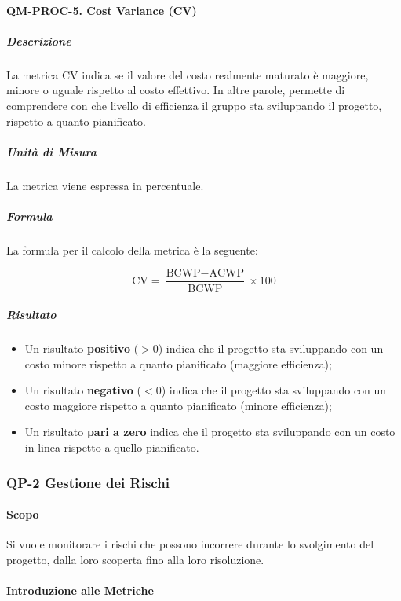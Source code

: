		\paragraph{QM-PROC-5. Cost Variance (CV)}

			\subparagraph{Descrizione}
			La metrica CV indica se il valore del costo realmente maturato è maggiore, minore o uguale rispetto al costo effettivo. In altre parole, permette di comprendere con che livello di efficienza il gruppo sta sviluppando il progetto, rispetto a quanto pianificato.

			\subparagraph{Unità di Misura}
			La metrica viene espressa in percentuale.

			\subparagraph{Formula}
			La formula per il calcolo della metrica è la seguente:

			\[
				\text{CV} = \frac{\text{BCWP} - \text{ACWP}}{\text{BCWP}} \times 100
			\]

			\subparagraph{Risultato}
			\begin{itemize}
				\item Un risultato \textbf{positivo} (\(> 0\)) indica che il progetto sta sviluppando con un costo minore rispetto a quanto pianificato (maggiore efficienza);
				\item Un risultato \textbf{negativo} (\(< 0\)) indica che il progetto sta sviluppando con un costo maggiore rispetto a quanto pianificato (minore efficienza);
				\item Un risultato \textbf{pari a zero} indica che il progetto sta sviluppando con un costo in linea rispetto a quello pianificato.
			\end{itemize}

	\subsubsection{QP-2 Gestione dei Rischi}

		\paragraph{Scopo}

		Si vuole monitorare i rischi che possono incorrere durante lo svolgimento del progetto, dalla loro scoperta fino alla loro risoluzione.

		\paragraph{Introduzione alle Metriche}

